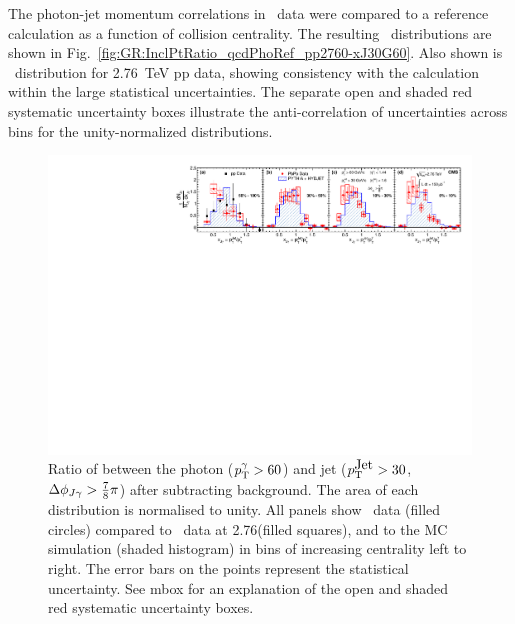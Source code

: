 The photon-jet momentum correlations in \PbPb\ data were compared to a \PYTHYD reference 
calculation as a function of collision centrality. The resulting 
\xjg\ distributions are shown in Fig.~\ref{fig:GR:InclPtRatio_qcdPhoRef_pp2760-xJ30G60}.
Also shown is \avexjg\ distribution for 2.76~TeV pp data, showing consistency 
with the \PYTHYD calculation within the large statistical uncertainties.
The separate open and shaded red systematic uncertainty boxes illustrate the 
anti-correlation of uncertainties across bins for the unity-normalized distributions.

\begin{figure}[!h]
\begin{center}
\includegraphics[width=0.98\mboxwidth]{jetfigures/Photonv7_Paper_InclPtRatio_all_cent4_G60J30_subDPhi1SS1_Isol0_Norm1log1.pdf}
\caption[]{\label{fig:GR:InclPtRatio_qcdPhoRef_pp2760-xJ30G60} Ratio of \pt{} between the
  photon ($p_{\rm{T}}^{\gamma} > 60$\GeVc) and jet ($p_{\rm{T}}^{\mbox{Jet}} > 30$\GeVc, $\Delta\phi_{J\gamma} > \frac{7}{8}\pi$)
  after subtracting background. The area of each distribution is normalised to unity. All panels show
\PbPb\ data (filled circles) compared to \pp\ data at
  2.76\TeV (filled squares), and to the \PYTHYD{} MC simulation
  (shaded histogram) in bins of increasing centrality left to right. The error bars
  on the points represent the statistical uncertainty.
  See mbox for an explanation of the open and shaded red systematic
  uncertainty boxes.
}
\label{fig:GR:CMS_xjg}
\end{center}
\end{figure}

